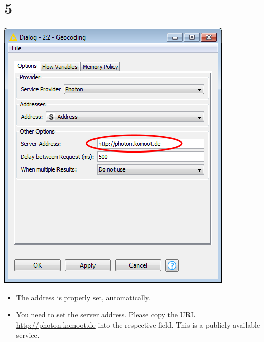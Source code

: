 \documentclass[10pt]{beamer}
\begin{document}
\section{5}
\begin{frame}
	\begin{center}
  		\includegraphics[height=0.6\textheight]{5.png}
	\end{center}
	\begin{itemize}
    \item The address is properly set, automatically.
		\item You need to set the server address. Please copy the URL  \url{http://photon.komoot.de} into the respective field. This is a publicly available service.
	\end{itemize}
\end{frame}
\end{document}
